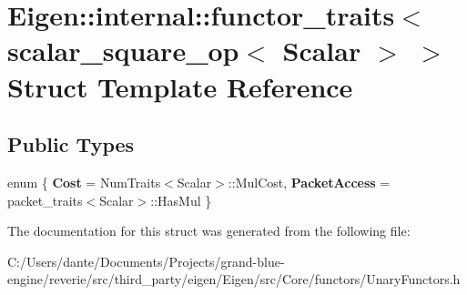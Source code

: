 \hypertarget{struct_eigen_1_1internal_1_1functor__traits_3_01scalar__square__op_3_01_scalar_01_4_01_4}{}\section{Eigen\+::internal\+::functor\+\_\+traits$<$ scalar\+\_\+square\+\_\+op$<$ Scalar $>$ $>$ Struct Template Reference}
\label{struct_eigen_1_1internal_1_1functor__traits_3_01scalar__square__op_3_01_scalar_01_4_01_4}
\subsection*{Public Types}
\begin{DoxyCompactItemize}
\item 
\mbox{\label{struct_eigen_1_1internal_1_1functor__traits_3_01scalar__square__op_3_01_scalar_01_4_01_4_a4b91932912b61bcb9bd9397594c51b0b}} 
enum \{ {\bfseries Cost} = Num\+Traits$<$Scalar$>$\+::Mul\+Cost, 
{\bfseries Packet\+Access} = packet\+\_\+traits$<$Scalar$>$\+::Has\+Mul
 \}
\end{DoxyCompactItemize}


The documentation for this struct was generated from the following file\+:\begin{DoxyCompactItemize}
\item 
C\+:/\+Users/dante/\+Documents/\+Projects/grand-\/blue-\/engine/reverie/src/third\+\_\+party/eigen/\+Eigen/src/\+Core/functors/Unary\+Functors.\+h\end{DoxyCompactItemize}
